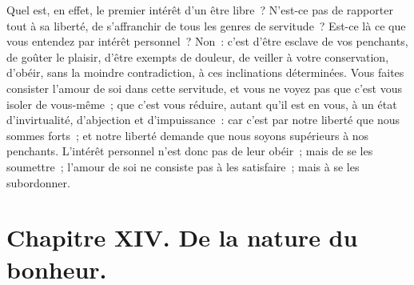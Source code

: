 \documentclass[french,twoside]{book} %
\newcommand\chapteropen{} %
\newcommand\chapterclose{} %
\begin{document}
Quel est, en effet, le premier intérêt d’un être libre ? N’est-ce pas de rapporter tout à sa liberté, de s’affranchir de tous les genres de servitude ? Est-ce là ce que vous entendez par intérêt personnel ? Non : c’est d’être esclave de vos penchants, de goûter le plaisir, d’être exempts de douleur, de veiller à votre conservation, d’obéir, sans la moindre contradiction, à ces inclinations déterminées. Vous faites consister l’amour de soi dans cette servitude, et vous ne voyez pas que c’est vous isoler de vous-même ; que c’est vous réduire, autant qu’il est en vous, à un état d’invirtualité, d’abjection et d’impuissance : car c’est par notre liberté que nous sommes forts ; et notre liberté demande que nous soyons supérieurs à nos penchants. L’intérêt personnel n’est donc pas de leur obéir ; mais de se les soumettre ; l’amour de soi ne consiste pas à les satisfaire ; mais à se les subordonner.
\chapterclose


\chapteropen
\chapter[{Chapitre XIV. De la nature du bonheur.}]{Chapitre XIV. De la nature du bonheur.}\renewcommand{\leftmark}{Chapitre XIV. De la nature du bonheur.}
\end{document}
